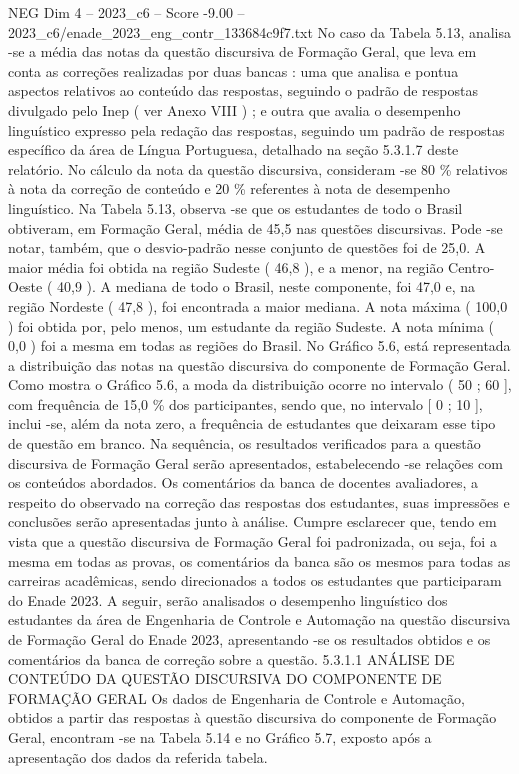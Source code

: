 \begin{textsample}{NEG Dim 4 – 2023\_c6 – Score -9.00 – 2023\_c6/enade\_2023\_eng\_contr\_133684c9f7.txt}
No caso da Tabela 5.13, analisa -se a média das notas da questão discursiva de Formação Geral, que leva em conta as correções realizadas por duas bancas : uma que analisa e pontua aspectos relativos ao conteúdo das respostas, seguindo o padrão de respostas divulgado pelo Inep ( ver Anexo VIII ) ; e outra que avalia o desempenho linguístico expresso pela redação das respostas, seguindo um padrão de respostas específico da área de Língua Portuguesa, detalhado na seção 5.3.1.7 deste relatório.
No cálculo da nota da questão discursiva, consideram -se 80 \% relativos à nota da correção de conteúdo e 20 \% referentes à nota de desempenho linguístico.
Na Tabela 5.13, observa -se que os estudantes de todo o Brasil obtiveram, em Formação Geral, média de 45,5 nas questões discursivas.
Pode -se notar, também, que o desvio-padrão nesse conjunto de questões foi de 25,0.
A maior média foi obtida na região Sudeste ( 46,8 ), e a menor, na região Centro-Oeste ( 40,9 ).
A mediana de todo o Brasil, neste componente, foi 47,0 e, na região Nordeste ( 47,8 ), foi encontrada a maior mediana.
A nota máxima ( 100,0 ) foi obtida por, pelo menos, um estudante da região Sudeste.
A nota mínima ( 0,0 ) foi a mesma em todas as regiões do Brasil.
No Gráfico 5.6, está representada a distribuição das notas na questão discursiva do componente de Formação Geral.
Como mostra o Gráfico 5.6, a moda da distribuição ocorre no intervalo ( 50 ; 60 ], com frequência de 15,0 \% dos participantes, sendo que, no intervalo [ 0 ; 10 ], inclui -se, além da nota zero, a frequência de estudantes que deixaram esse tipo de questão em branco.
Na sequência, os resultados verificados para a questão discursiva de Formação Geral serão apresentados, estabelecendo -se relações com os conteúdos abordados.
Os comentários da banca de docentes avaliadores, a respeito do observado na correção das respostas dos estudantes, suas impressões e conclusões serão apresentadas junto à análise.
Cumpre esclarecer que, tendo em vista que a questão discursiva de Formação Geral foi padronizada, ou seja, foi a mesma em todas as provas, os comentários da banca são os mesmos para todas as carreiras acadêmicas, sendo direcionados a todos os estudantes que participaram do Enade 2023.
A seguir, serão analisados o desempenho linguístico dos estudantes da área de Engenharia de Controle e Automação na questão discursiva de Formação Geral do Enade 2023, apresentando -se os resultados obtidos e os comentários da banca de correção sobre a questão. 5.3.1.1 ANÁLISE DE CONTEÚDO DA QUESTÃO DISCURSIVA DO COMPONENTE DE FORMAÇÃO GERAL Os dados de Engenharia de Controle e Automação, obtidos a partir das respostas à questão discursiva do componente de Formação Geral, encontram -se na Tabela 5.14 e no Gráfico 5.7, exposto após a apresentação dos dados da referida tabela.

\end{textsample}
